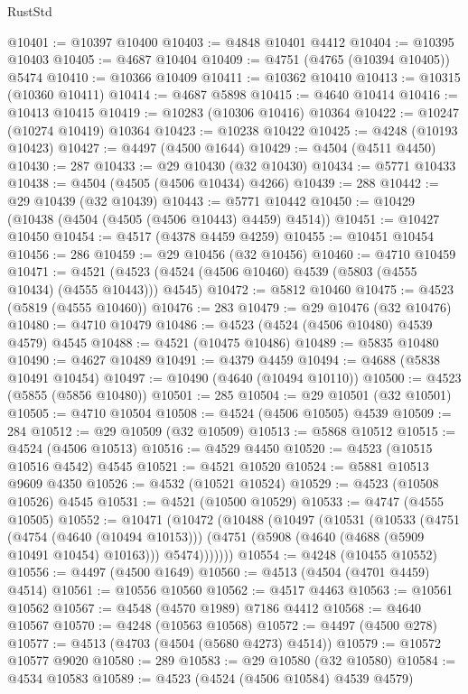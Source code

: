 \begin{lexlean}{RustStd}
\begin{coremodule}
@10401 := @10397 @10400
@10403 := @4848 @10401 @4412
@10404 := @10395 @10403
@10405 := @4687 @10404
@10409 := @4751 (@4765 (@10394 @10405)) @5474
@10410 := @10366 @10409
@10411 := @10362 @10410
@10413 := @10315 (@10360 @10411)
@10414 := @4687 @5898
@10415 := @4640 @10414
@10416 := @10413 @10415
@10419 := @10283 (@10306 @10416) @10364
@10422 := @10247 (@10274 @10419) @10364
@10423 := @10238 @10422
@10425 := @4248 (@10193 @10423)
@10427 := @4497 (@4500 @1644)
@10429 := @4504 (@4511 @4450)
@10430 := 287
@10433 := @29 @10430 (@32 @10430)
@10434 := @5771 @10433
@10438 := @4504 (@4505 (@4506 @10434) @4266)
@10439 := 288
@10442 := @29 @10439 (@32 @10439)
@10443 := @5771 @10442
@10450 := @10429 (@10438 (@4504 (@4505 (@4506 @10443) @4459) @4514))
@10451 := @10427 @10450
@10454 := @4517 (@4378 @4459 @4259)
@10455 := @10451 @10454
@10456 := 286
@10459 := @29 @10456 (@32 @10456)
@10460 := @4710 @10459
@10471 := @4521 (@4523 (@4524 (@4506 @10460) @4539 (@5803 (@4555 @10434) (@4555 @10443))) @4545)
@10472 := @5812 @10460
@10475 := @4523 (@5819 (@4555 @10460))
@10476 := 283
@10479 := @29 @10476 (@32 @10476)
@10480 := @4710 @10479
@10486 := @4523 (@4524 (@4506 @10480) @4539 @4579) @4545
@10488 := @4521 (@10475 @10486)
@10489 := @5835 @10480
@10490 := @4627 @10489
@10491 := @4379 @4459
@10494 := @4688 (@5838 @10491 @10454)
@10497 := @10490 (@4640 (@10494 @10110))
@10500 := @4523 (@5855 (@5856 @10480))
@10501 := 285
@10504 := @29 @10501 (@32 @10501)
@10505 := @4710 @10504
@10508 := @4524 (@4506 @10505) @4539
@10509 := 284
@10512 := @29 @10509 (@32 @10509)
@10513 := @5868 @10512
@10515 := @4524 (@4506 @10513)
@10516 := @4529 @4450
@10520 := @4523 (@10515 @10516 @4542) @4545
@10521 := @4521 @10520
@10524 := @5881 @10513 @9609 @4350
@10526 := @4532 (@10521 @10524)
@10529 := @4523 (@10508 @10526) @4545
@10531 := @4521 (@10500 @10529)
@10533 := @4747 (@4555 @10505)
@10552 := @10471
    (@10472
      (@10488
        (@10497
          (@10531
            (@10533
              (@4751
                (@4754 (@4640 (@10494 @10153)))
                (@4751 (@5908 (@4640 (@4688 (@5909 @10491 @10454) @10163))) @5474)))))))
@10554 := @4248 (@10455 @10552)
@10556 := @4497 (@4500 @1649)
@10560 := @4513 (@4504 (@4701 @4459) @4514)
@10561 := @10556 @10560
@10562 := @4517 @4463
@10563 := @10561 @10562
@10567 := @4548 (@4570 @1989) @7186 @4412
@10568 := @4640 @10567
@10570 := @4248 (@10563 @10568)
@10572 := @4497 (@4500 @278)
@10577 := @4513 (@4703 (@4504 (@5680 @4273) @4514))
@10579 := @10572 @10577 @9020
@10580 := 289
@10583 := @29 @10580 (@32 @10580)
@10584 := @4534 @10583
@10589 := @4523 (@4524 (@4506 @10584) @4539 @4579)

\end{coremodule}
\end{lexlean}
